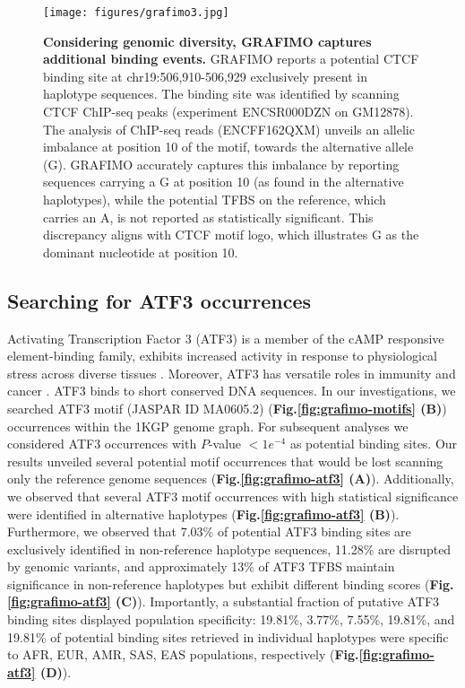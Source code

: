 \documentclass[a4paper, titlepage, openright]{book}
\newcommand{\grafimo}{GRAFIMO\xspace}
\begin{document}
% 
\begin{figure}
    \centering
    \texttt{[image: figures/grafimo3.jpg]}
    \caption[Considering genomic diversity, \grafimo captures additional binding events]{\textbf{Considering genomic diversity, \grafimo captures additional binding events.} \grafimo reports a potential CTCF binding site at chr19:506,910-506,929 exclusively present in haplotype sequences. The binding site was identified by scanning CTCF ChIP-seq peaks (experiment ENCSR000DZN on GM12878). The analysis of ChIP-seq reads (ENCFF162QXM) unveils an allelic imbalance at position 10 of the motif, towards the alternative allele (G). \grafimo accurately captures this imbalance by reporting sequences carrying a G at position 10 (as found in the alternative haplotypes), while the potential TFBS on the reference, which carries an A, is not reported as statistically significant. This discrepancy aligns with CTCF motif logo, which illustrates G as the dominant nucleotide at position 10.}
    \label{fig:grafimo-allelic-imbalance}
\end{figure}

\subsection{Searching for ATF3 occurrences}
Activating Transcription Factor 3 (ATF3) is a member of the cAMP responsive element-binding family, exhibits increased activity in response to physiological stress across diverse tissues \citep{chen1996analysis}. Moreover, ATF3 has versatile roles in immunity and cancer \citep{thompson2009atf3}. ATF3 binds to short conserved DNA sequences. In our investigations, we searched ATF3 motif (JASPAR ID MA0605.2) (\textbf{Fig.\ref{fig:grafimo-motifs} (B)}) occurrences within the 1KGP genome graph. For subsequent analyses we considered ATF3 occurrences with $P$-value $< 1e^{-4}$ as potential binding sites. Our results unveiled several potential motif occurrences that would be lost scanning only the reference genome sequences (\textbf{Fig.\ref{fig:grafimo-atf3} (A)}). Additionally, we observed that several ATF3 motif occurrences with high statistical significance were identified in alternative haplotypes (\textbf{Fig.\ref{fig:grafimo-atf3} (B)}). Furthermore, we observed that 7.03\% of potential ATF3 binding sites are exclusively identified in non-reference haplotype sequences, 11.28\% are disrupted by genomic variants, and approximately 13\% of ATF3 TFBS maintain significance in non-reference haplotypes but exhibit different binding scores (\textbf{Fig.\ref{fig:grafimo-atf3} (C)}). Importantly, a substantial fraction of putative ATF3 binding sites displayed population specificity: 19.81\%, 3.77\%, 7.55\%, 19.81\%, and 19.81\% of potential binding sites retrieved in individual haplotypes were specific to AFR, EUR, AMR, SAS, EAS populations, respectively (\textbf{Fig.\ref{fig:grafimo-atf3} (D)}). 
\end{document}
